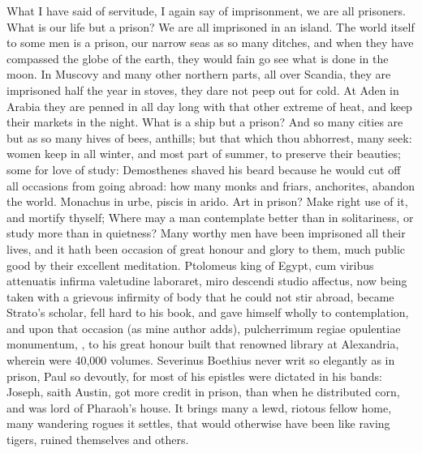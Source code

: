 {What I have said of servitude, I again say of imprisonment, we are all
prisoners. What is our life but a prison? We are all imprisoned
in an island. The world itself to some men is a prison, our narrow seas
as so many ditches, and when they have compassed the globe of the
earth, they would fain go see what is done in the moon. In
Muscovy and many other northern parts, all over Scandia, they are
imprisoned half the year in stoves, they dare not peep out for cold. At
Aden in Arabia they are penned in all day long with that other
extreme of heat, and keep their markets in the night. What is a ship
but a prison? And so many cities are but as so many hives of bees,
anthills; but that which thou abhorrest, many seek: women keep in all
winter, and most part of summer, to preserve their beauties; some for
love of study: Demosthenes shaved his beard because he would cut off
all occasions from going abroad: how many monks and friars, anchorites,
abandon the world. Monachus in urbe, piscis in arido. Art in prison?
Make right use of it, and mortify thyself;  Where may a man
contemplate better than in solitariness, or study more than in
quietness? Many worthy men have been imprisoned all their lives, and it
hath been occasion of great honour and glory to them, much public good
by their excellent meditation. Ptolomeus king of Egypt, cum
viribus attenuatis infirma valetudine laboraret, miro descendi studio
affectus, \etc{} now being taken with a grievous infirmity of body that he
could not stir abroad, became Strato's scholar, fell hard to his book,
and gave himself wholly to contemplation, and upon that occasion (as
mine author adds), pulcherrimum regiae opulentiae monumentum, \etc{}, to
his great honour built that renowned library at Alexandria, wherein
were 40,000 volumes. Severinus Boethius never writ so elegantly as in
prison, Paul so devoutly, for most of his epistles were dictated in his
bands: Joseph, saith Austin, got more credit in prison, than when
he distributed corn, and was lord of Pharaoh's house. It brings many a
lewd, riotous fellow home, many wandering rogues it settles, that would
otherwise have been like raving tigers, ruined themselves and others.

}
